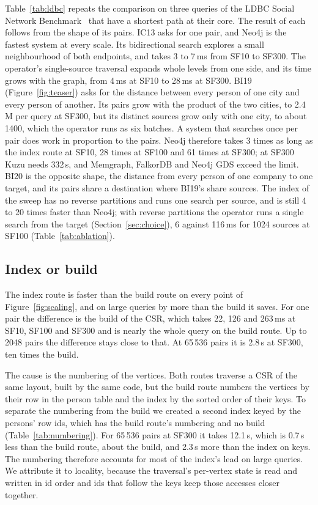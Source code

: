 Table~\ref{tab:ldbc} repeats the comparison on three queries of the LDBC Social Network
Benchmark~\cite{erling2015ldbc,puroja2023ldbcv2,szarnyas2022ldbcbi} that have a shortest path at their core. The result of each follows from the shape of its pairs. IC13 asks for one pair, and Neo4j is the fastest system at every scale. Its
bidirectional search explores a small neighbourhood of both endpoints, and takes 3 to 7\,ms from SF10 to SF300. The operator's single-source traversal expands whole levels from one side, and its time grows with the graph, from 4\,ms at SF10 to 28\,ms at SF300. BI19 (Figure~\ref{fig:teaser}) asks for the distance between every person of one city and every
person of another. Its pairs grow with the product of the two cities, to 2.4\,M per query at SF300, but its distinct
sources grow only with one city, to about 1400, which the operator runs as six batches. A system that searches once per pair does work in proportion to the pairs. Neo4j therefore takes 3 times as long as the index route at SF10, 28 times at SF100 and 61 times at SF300; at SF300 Kuzu needs 332\,s, and Memgraph, FalkorDB and Neo4j GDS exceed the limit.
BI20 is the opposite shape, the distance from every person of one company to one target, and its pairs share a destination where BI19's share sources. The index of the sweep has no reverse partitions and runs one search per source, and is still 4 to 20 times faster than Neo4j; with reverse partitions the operator runs a single search from the target
(Section~\ref{sec:choice}), 6 against 116\,ms for 1024 sources at SF100 (Table~\ref{tab:ablation}).

\subsection{Index or build}
\label{sec:eval-index}




The index route is faster than the build route on every point of Figure~\ref{fig:scaling}, and on large queries
by more than the build it saves. For one pair the difference is the build of the CSR, which takes 22, 126 and
263\,ms at SF10, SF100 and SF300 and is nearly the whole query on the build route. Up to 2048 pairs the difference
stays close to that. At 65\,536 pairs it is 2.8\,s at SF300, ten times the build.

The cause is the numbering of the vertices. Both routes traverse a CSR of the same layout, built by the same code,
but the build route numbers the vertices by their row in the person table and the index by the sorted order of their
keys. To separate the numbering from the build we created a second index keyed by the persons' row ids, which has the
build route's numbering and no build (Table~\ref{tab:numbering}). For 65\,536 pairs at SF300 it takes 12.1\,s, which
is 0.7\,s less than the build route, about the build, and 2.3\,s more than the index on keys. The numbering therefore
accounts for most of the index's lead on large queries. We attribute it to locality, because the traversal's per-vertex state is read and written in id order and ids that follow the keys keep those accesses closer together.

